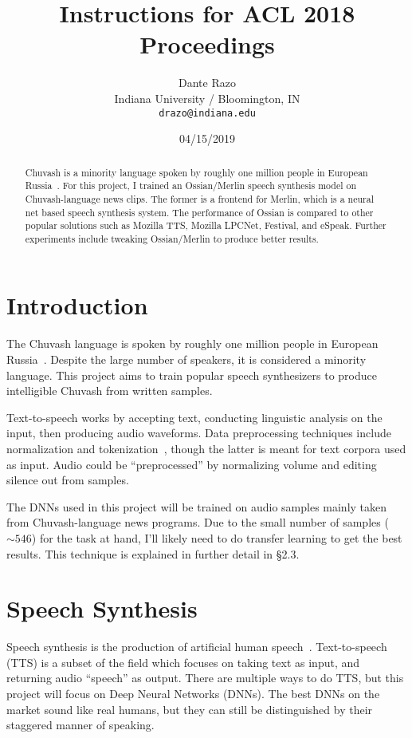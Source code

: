 \documentclass[11pt,a4paper]{article}
\title{Instructions for ACL 2018 Proceedings}
\author{Dante Razo \\
  Indiana University / Bloomington, IN \\
  {\tt drazo@indiana.edu} \\}
\date{04/15/2019}
\begin{document}
\maketitle
\begin{abstract}
  Chuvash is a minority language spoken by roughly one million people in European Russia~\cite{RBS:12}. For this project, I trained an Ossian/Merlin speech synthesis model on Chuvash-language news clips. The former is a frontend for Merlin, which is a neural net based speech synthesis system. The performance of Ossian is compared to other popular solutions such as Mozilla TTS, Mozilla LPCNet, Festival, and eSpeak. Further experiments include tweaking Ossian/Merlin to produce better results.
\end{abstract}

\section{Introduction}\label{sect:intro}
The Chuvash language is spoken by roughly one million people in European Russia~\cite{RBS:12}. Despite the large number of speakers, it is considered a minority language. This project aims to train popular speech synthesizers to produce intelligible Chuvash from written samples.



Text-to-speech works by accepting text, conducting linguistic analysis on the input, then producing audio waveforms. Data preprocessing techniques include normalization and tokenization~\cite{wiki-lexanalysis}, though the latter is meant for text corpora used as input. Audio could be ``preprocessed'' by normalizing volume and editing silence out from samples.

The DNNs used in this project will be trained on audio samples mainly taken from Chuvash-language news programs. Due to the small number of samples ($\sim546$) for the task at hand, I'll likely need to do transfer learning to get the best results. This technique is explained in further detail in \S2.3.

\section{Speech Synthesis}\label{sect:speech}
Speech synthesis is the production of artificial human speech~\cite{wiki-speechsynthesis}. Text-to-speech (TTS) is a subset of the field which focuses on taking text as input, and returning audio ``speech'' as output. There are multiple ways to do TTS, but this project will focus on Deep Neural Networks (DNNs). The best DNNs on the market sound like real humans, but they can still be distinguished by their staggered manner of speaking.
\end{document}
